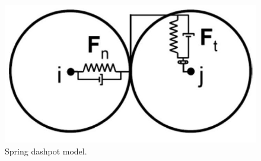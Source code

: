 \begin{figure}[!htb]
\centering
\includegraphics[width=.40\columnwidth]{images/128springdashpot}
\caption[Spring dashpot]{Spring dashpot model.}
\label{fig:128springdashpot}
\end{figure}
